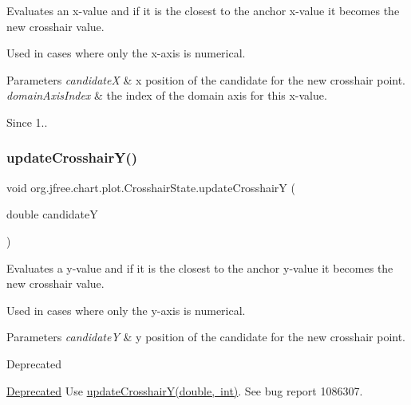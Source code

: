 Evaluates an x-\/value and if it is the closest to the anchor x-\/value it becomes the new crosshair value. 

Used in cases where only the x-\/axis is numerical.


\begin{DoxyParams}{Parameters}
{\em candidateX} & x position of the candidate for the new crosshair point. \\
\hline
{\em domain\+Axis\+Index} & the index of the domain axis for this x-\/value.\\
\hline
\end{DoxyParams}
\begin{DoxySince}{Since}
1.. 
\end{DoxySince}
\mbox{\label{classorg_1_1jfree_1_1chart_1_1plot_1_1_crosshair_state_a6da9f1a7c1c05c6251394218a9c0d5d1}} 
\subsubsection{\texorpdfstring{update\+Crosshair\+Y()}{updateCrosshairY()}\hspace{0.1cm}{\footnotesize\ttfamily [1/2]}}
{\footnotesize\ttfamily void org.\+jfree.\+chart.\+plot.\+Crosshair\+State.\+update\+CrosshairY (\begin{DoxyParamCaption}\item[{double}]{candidateY }\end{DoxyParamCaption})}

Evaluates a y-\/value and if it is the closest to the anchor y-\/value it becomes the new crosshair value. 

Used in cases where only the y-\/axis is numerical.


\begin{DoxyParams}{Parameters}
{\em candidateY} & y position of the candidate for the new crosshair point.\\
\hline
\end{DoxyParams}
\begin{DoxyRefDesc}{Deprecated}
\item[\mbox{\hyperlink{deprecated__deprecated000059}{Deprecated}}]Use \mbox{\hyperlink{classorg_1_1jfree_1_1chart_1_1plot_1_1_crosshair_state_ad92b1c0208cd86cbdcb79bee76d5f5c7}{update\+Crosshair\+Y(double, int)}}. See bug report 1086307. \end{DoxyRefDesc}
\mbox{\label{classorg_1_1jfree_1_1chart_1_1plot_1_1_crosshair_state_ad92b1c0208cd86cbdcb79bee76d5f5c7}} 
